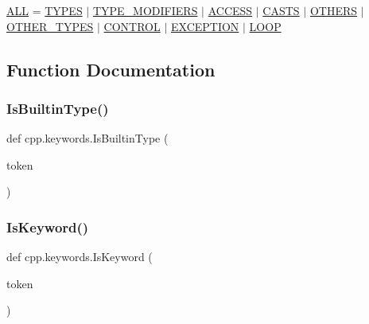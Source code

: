 \begin{DoxyCompactItemize}
\mbox{\hyperlink{namespacecpp_1_1keywords_a2e8727b78fb9434c99ac8518c6dd1ecc}{A\+LL}} = \mbox{\hyperlink{namespacecpp_1_1keywords_a56fd5baf357970548e1ec366edfc2c13}{T\+Y\+P\+ES}} $\vert$ \mbox{\hyperlink{namespacecpp_1_1keywords_af9282ce418d6b4b43dca5ed574caedd7}{T\+Y\+P\+E\+\_\+\+M\+O\+D\+I\+F\+I\+E\+RS}} $\vert$ \mbox{\hyperlink{namespacecpp_1_1keywords_a786f41bbea982641425c819d10bb2064}{A\+C\+C\+E\+SS}} $\vert$ \mbox{\hyperlink{namespacecpp_1_1keywords_aeba38dc38e188040f4ec44ba05092e7f}{C\+A\+S\+TS}} $\vert$ \mbox{\hyperlink{namespacecpp_1_1keywords_a15fe231fbad145538b73892804898809}{O\+T\+H\+E\+RS}} $\vert$ \mbox{\hyperlink{namespacecpp_1_1keywords_aa86a5e35a3ace14022a5ca1b91baf207}{O\+T\+H\+E\+R\+\_\+\+T\+Y\+P\+ES}} $\vert$ \mbox{\hyperlink{namespacecpp_1_1keywords_a374dfe9c96681079802ba4724287b8ff}{C\+O\+N\+T\+R\+OL}} $\vert$ \mbox{\hyperlink{namespacecpp_1_1keywords_a2665fb8a25a4dae03fa5d3dc975c537c}{E\+X\+C\+E\+P\+T\+I\+ON}} $\vert$ \mbox{\hyperlink{namespacecpp_1_1keywords_af0164c05398a2291487b76414102d555}{L\+O\+OP}}
\end{DoxyCompactItemize}


\subsection{Function Documentation}
\mbox{\label{namespacecpp_1_1keywords_ae0f7a581fef26ad1a71c59bd963ee285}} 
\subsubsection{\texorpdfstring{IsBuiltinType()}{IsBuiltinType()}}
{\footnotesize\ttfamily def cpp.\+keywords.\+Is\+Builtin\+Type (\begin{DoxyParamCaption}\item[{}]{token }\end{DoxyParamCaption})}

\mbox{\label{namespacecpp_1_1keywords_ab9edc2cbd4a9d5ad58a1c0ad3281cbc9}} 
\subsubsection{\texorpdfstring{IsKeyword()}{IsKeyword()}}
{\footnotesize\ttfamily def cpp.\+keywords.\+Is\+Keyword (\begin{DoxyParamCaption}\item[{}]{token }\end{DoxyParamCaption})}



